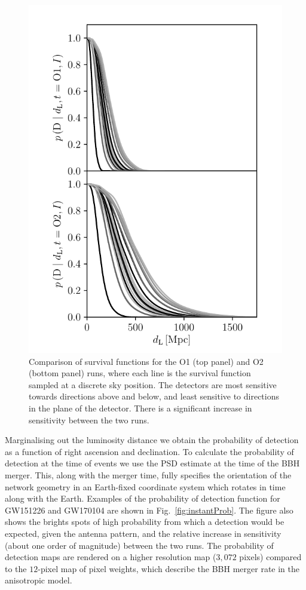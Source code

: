 \documentclass[usenatbib,useAMS]{mnras}
\begin{document}
% 
\begin{figure}
    \centering
    \includegraphics[width=0.9\columnwidth]{./figures/survival.pdf}
    \caption{Comparison of survival functions for the O1 (top panel)
    and O2 (bottom panel) runs, where each line is the survival function sampled
    at a discrete
    sky position. The detectors are most sensitive towards directions above and
    below, and least sensitive to directions in the plane of the detector. There
    is a significant increase in sensitivity between the two runs.} 
    \label{fig:survivalPlots}
\end{figure}

% 
Marginalising out the luminosity distance we obtain the probability of detection
as a function of right ascension and declination. To calculate the probability
of detection at the time of events we use the \ac{PSD} estimate at the time of
the \ac{BBH} merger. This, along with the merger time, fully specifies the
orientation of the network geometry in an Earth-fixed coordinate system which
rotates in time along with the Earth. Examples of the probability of detection
function for GW151226 and GW170104 are shown in Fig.~\ref{fig:instantProb}. The
figure also shows the brights spots of high probability from which a detection
would be expected, given the antenna pattern, and the relative increase in
sensitivity (about one order of magnitude) between the two runs.
The probability of detection maps are rendered on a higher resolution map
($3,072$ pixels) compared to the $12$-pixel map of pixel weights, which
describe the \ac{BBH} merger rate in the anisotropic model.
\end{document}
